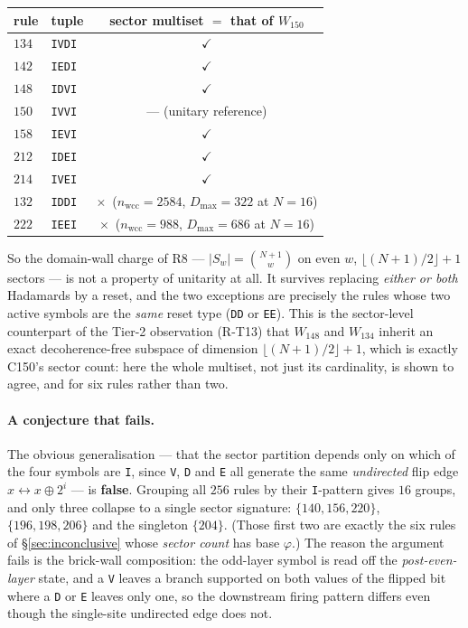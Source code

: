 \documentclass[11pt]{article}
\newcommand{\rt}[1]{\texttt{#1}}
\newcommand{\cmark}{\ensuremath{\checkmark}}
\newcommand{\xmark}{\ensuremath{\times}}
\newcommand{\wcc}{\mathrm{wcc}}
\theoremstyle{plain}
\theoremstyle{definition}
\begin{document}
\begin{center}
\begin{tabular}{llc}
\toprule
rule & tuple & sector multiset $=$ that of $W_{150}$ \\
\midrule
$134$ & \rt{IVDI} & \cmark \\
$142$ & \rt{IEDI} & \cmark \\
$148$ & \rt{IDVI} & \cmark \\
$150$ & \rt{IVVI} & --- (unitary reference) \\
$158$ & \rt{IEVI} & \cmark \\
$212$ & \rt{IDEI} & \cmark \\
$214$ & \rt{IVEI} & \cmark \\
$132$ & \rt{IDDI} & \xmark\ ($n_\wcc=2584$, $D_{\max}=322$ at $N=16$) \\
$222$ & \rt{IEEI} & \xmark\ ($n_\wcc=988$, $D_{\max}=686$ at $N=16$) \\
\bottomrule
\end{tabular}
\end{center}

\noindent So the domain-wall charge of R8 --- $|S_w|=\binom{N+1}{w}$ on even $w$,
$\lfloor(N+1)/2\rfloor+1$ sectors --- is not a property of unitarity at all. It
survives replacing \emph{either or both} Hadamards by a reset, and the two
exceptions are precisely the rules whose two active symbols are the \emph{same}
reset type (\rt{DD} or \rt{EE}). This is the sector-level counterpart of the
Tier-2 observation (R-T13) that $W_{148}$ and $W_{134}$ inherit an exact
decoherence-free subspace of dimension $\lfloor(N+1)/2\rfloor+1$, which is
exactly C150's sector count: here the whole multiset, not just its cardinality,
is shown to agree, and for six rules rather than two.

\paragraph{A conjecture that fails.} The obvious generalisation --- that the
sector partition depends only on which of the four symbols are \rt{I}, since
\rt{V}, \rt{D} and \rt{E} all generate the same \emph{undirected} flip edge
$x\leftrightarrow x\oplus2^i$ --- is \textbf{false}. Grouping all $256$ rules by
their \rt{I}-pattern gives $16$ groups, and only three collapse to a single
sector signature: $\{140,156,220\}$, $\{196,198,206\}$ and the singleton
$\{204\}$. (Those first two are exactly the six rules of
\S\ref{sec:inconclusive} whose \emph{sector count} has base $\varphi$.) The reason the
argument fails is the brick-wall composition: the odd-layer symbol is read off
the \emph{post-even-layer} state, and a \rt{V} leaves a branch supported on both
values of the flipped bit where a \rt{D} or \rt{E} leaves only one, so the
downstream firing pattern differs even though the single-site undirected edge
does not.
\end{document}
